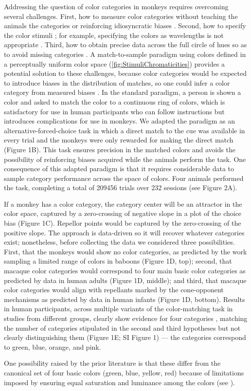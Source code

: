 Addressing the question of color categories in monkeys requires overcoming several challenges. 
First, how to measure color categories without teaching the animals the categories or reinforcing idiosyncratic biases \citep{essock_color_1977,matsuno_color_2004}.
Second, how to specify the color stimuli \citep{siuda-krzywicka_biological_2019}; for example, specifying the colors as wavelengths \citep{sandell_color_1979}
is not appropriate \citep{davidoff_cross-species_2010}. 
Third, how to obtain precise data across the full circle of hues so as to avoid missing categories \citep{fagot_cross-species_2006}.
A match-to-sample paradigm using colors defined in a perceptually uniform color space (\autoref{fig:StimuliChromaticities}) provides a potential solution to these challenges, because color categories would be expected to introduce biases in the distribution of matches, so one could infer a color category from measured biases \citep{bae_why_2015}.  
In the standard paradigm, a person is shown a color and asked to match the color to a continuous ring of colors, which is satisfactory for use in human participants who can follow instructions but introduces complications for use in monkeys.
We adapted the paradigm as an alternative-forced-choice task in which a direct match to the cue was available in every trial and the monkeys were only rewarded for making the direct match (Figure 1B). 
This task ensures precision in the matched colors and avoids the possibility of reinforcing biases acquired while the animals perform the task.
One consequence of this adapted paradigm is that it requires considerable data to sample category performance across the space of colors. 
Four animals performed the task, completing a total of 209456 trials over 232 sessions (see Figure 2A).

If a monkey has a color category, the category center will be an attractor in the color space, captured by a zero-crossing of negative slope in a plot of the choice bias (Figure 1C). 
Repellor points would be captured by the zero-crossing of the positive slope.
The approach is data-driven so it will recover whatever categories exist; nonetheless, before collecting the data we considered three possibilities. 
First, that the monkeys would show no color categories, as predicted by the work sampling a limited range of colors in baboons \citep{davidoff_cross-species_2010}
(Figure 1D, top);
second, that macaque color categories would correspond to  four main basic color categories as predicted by data in human adults (Figure 1D, middle); 
and third, that macaque color categories would align with repellants marked by the cone-opponent mechanisms as predicted by data in human infants \citep{skelton_biological_2017} (Figure 1D, bottom). 
Results in human participants, across multiple variants of the color-matching task in studies from different groups, clearly show evidence for four categories \citep{bae_why_2015,panichello_error-correcting_2019}, matching the number of categories stipulated in the second and third hypotheses but not clearly distinguishing them (Figure 1E; SI Figure 1) — the categories correspond to green, blue, orange, and pink. 

One possibility raised by the prior literature is that these differ from the canonical set of four basic colors (green, blue, yellow, red) because of limitations imposed by ensuring equal saturation and luminance among the colors (see \citep{bae_why_2015}). 
